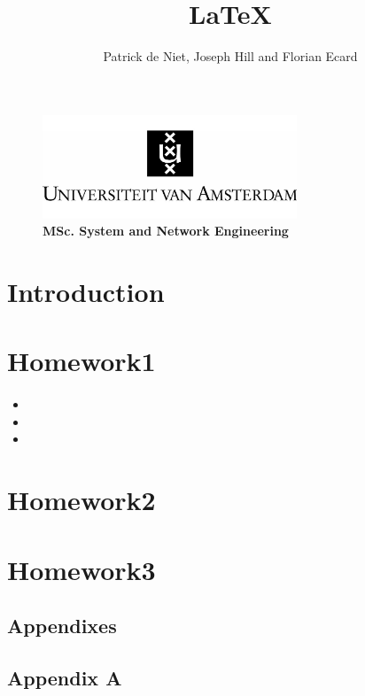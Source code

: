 \documentclass[10pt,a4paper]{article}
\author{Patrick de Niet, Joseph Hill and Florian Ecard}
\title{\LaTeX}
\begin{document}
    
\begin{figure}[t]
\centering
\includegraphics[width=7.6cm]{uva.jpg}\\
\textbf{{MSc. System and Network Engineering}}
\end{figure}
\maketitle


\newpage
\section{Introduction}
\paragraph{}


\section{Homework1}
\paragraph{}
\begin{itemize}
\item 
\item %
\item
\end{itemize}




\newpage
\section{Homework2}
\paragraph{}



\newpage
\section{Homework3}
\paragraph{}





\newpage
\listoffigures

\newpage
{}


\newpage
\appendix
\begin{center}
	\section*{Appendixes}

	\subsection*{Appendix A}
	\label{appa}
\end{center}
\end{document}
